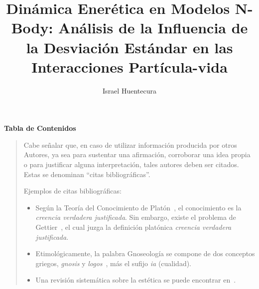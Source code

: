 \documentclass[letterpaper,12pt, twoside]{report}
\title{Dinámica Enerética en Modelos N-Body: Análisis de la Influencia de la Desviación Estándar en las Interacciones Partícula-vida} %
\author{Israel Huentecura} %
\begin{document}

\onehalfspace
{}
\cfoot{\thepage}
\tableofcontents
{} 
\listoffigures %
\listoftables %
{\textbf{Tabla de Contenidos}} 



{} 



\begin{quote}
Cabe señalar que, en caso de utilizar información producida por otros Autores, ya sea para sustentar una afirmación, corroborar una idea propia o para justificar alguna interpretación, tales autores deben ser citados. Estas se denominan ``citas bibliográficas''.

Ejemplos de citas bibliográficas:

\begin{itemize}
    \item Según la Teoría del Conocimiento de Platón~\cite{Teeteto}, el conocimiento es la \textit{creencia verdadera justificada}. Sin embargo, existe el problema de Gettier~\cite{Gettier}, el cual juzga la definición platónica \textit{creencia verdadera justificada}. 
    \item Etimológicamente, la palabra Gnoseología se compone de dos conceptos griegos, \textit{gnosis} y \textit{logos}~\cite{EtimGnoseologia}, más el sufijo \textit{ia} (cualidad).
    \item Una revisión sistemática sobre la estética se puede encontrar en~\cite{Logos}.
\end{itemize}


\end{quote}
\end{document}
